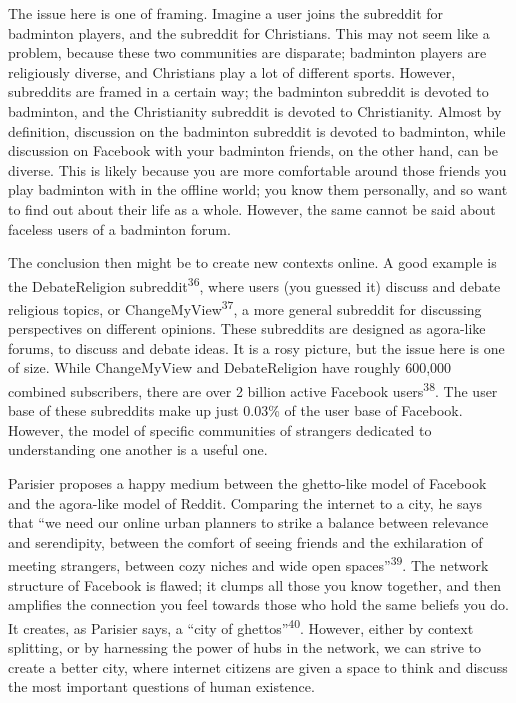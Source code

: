 \documentclass[]{article}
\begin{document}
The issue here is one of framing. Imagine a user joins the subreddit for
badminton players, and the subreddit for Christians. This may not seem
like a problem, because these two communities are disparate; badminton
players are religiously diverse, and Christians play a lot of different
sports. However, subreddits are framed in a certain way; the badminton
subreddit is devoted to badminton, and the Christianity subreddit is
devoted to Christianity. Almost by definition, discussion on the
badminton subreddit is devoted to badminton, while discussion on
Facebook with your badminton friends, on the other hand, can be diverse.
This is likely because you are more comfortable around those friends you
play badminton with in the offline world; you know them personally, and
so want to find out about their life as a whole. However, the same
cannot be said about faceless users of a badminton forum.

The conclusion then might be to create new contexts online. A good
example is the DebateReligion subreddit\textsuperscript{36}, where users
(you guessed it) discuss and debate religious topics, or
ChangeMyView\textsuperscript{37}, a more general subreddit for
discussing perspectives on different opinions. These subreddits are
designed as agora-like forums, to discuss and debate ideas. It is a rosy
picture, but the issue here is one of size. While ChangeMyView and
DebateReligion have roughly 600,000 combined subscribers, there are over
2 billion active Facebook users\textsuperscript{38}. The user base of
these subreddits make up just 0.03\% of the user base of Facebook.
However, the model of specific communities of strangers dedicated to
understanding one another is a useful one.

Parisier proposes a happy medium between the ghetto-like model of
Facebook and the agora-like model of Reddit. Comparing the internet to a
city, he says that ``we need our online urban planners to strike a
balance between relevance and serendipity, between the comfort of seeing
friends and the exhilaration of meeting strangers, between cozy niches
and wide open spaces''\textsuperscript{39}. The network structure of
Facebook is flawed; it clumps all those you know together, and then
amplifies the connection you feel towards those who hold the same
beliefs you do. It creates, as Parisier says, a ``city of
ghettos''\textsuperscript{40}. However, either by context splitting, or
by harnessing the power of hubs in the network, we can strive to create
a better city, where internet citizens are given a space to think and
discuss the most important questions of human existence.
\end{document}
